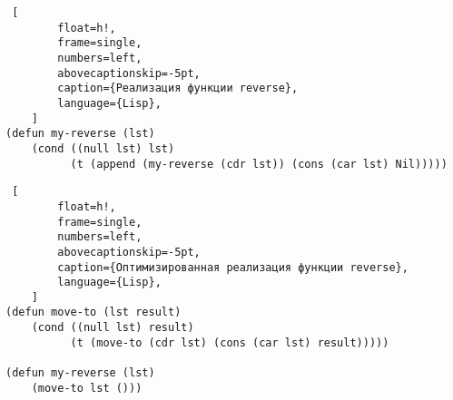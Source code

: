 \begin{lstlisting} [
		float=h!,
		frame=single,
		numbers=left,
		abovecaptionskip=-5pt,
		caption={Реализация функции reverse},
		language={Lisp},
	]
(defun my-reverse (lst)
    (cond ((null lst) lst)
          (t (append (my-reverse (cdr lst)) (cons (car lst) Nil)))))
\end{lstlisting}

\begin{lstlisting} [
		float=h!,
		frame=single,
		numbers=left,
		abovecaptionskip=-5pt,
		caption={Оптимизированная реализация функции reverse},
		language={Lisp},
	]
(defun move-to (lst result)
    (cond ((null lst) result)
          (t (move-to (cdr lst) (cons (car lst) result)))))

(defun my-reverse (lst)
    (move-to lst ()))
\end{lstlisting}
